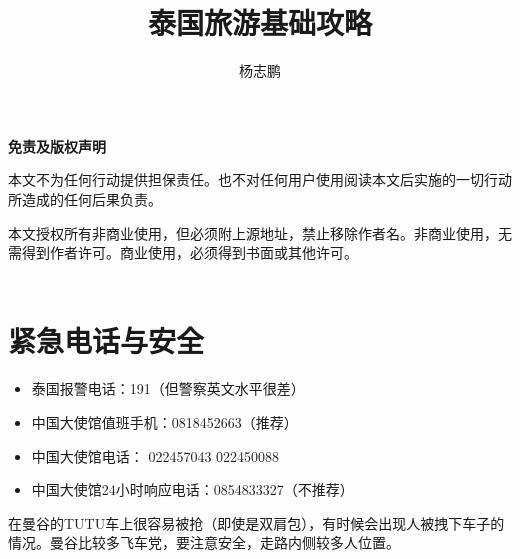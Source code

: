 \documentclass[utf-8,10pt]{ctexart}
\title{\textbf{泰国旅游基础攻略}}
\author{杨志鹏}
\begin{document}
\setcounter{page}{0}
\maketitle
\thispagestyle{empty}
\newpage
\pagestyle{fancy}
\tableofcontents
\paragraph{}
\noindent{}
\paragraph{}
\textbf{免责及版权声明}

本文不为任何行动提供担保责任。也不对任何用户使用阅读本文后实施的一切行动所造成的任何后果负责。

本文授权所有非商业使用，但必须附上源地址，禁止移除作者名。非商业使用，无需得到作者许可。商业使用，必须得到书面或其他许可。\\\\
\section{紧急电话与安全}
\begin{itemize}
\item 泰国报警电话：191（但警察英文水平很差）
\item 中国大使馆值班手机：0818452663（推荐）
\item 中国大使馆电话： 022457043 022450088
\item 中国大使馆24小时响应电话：0854833327（不推荐）
\end{itemize}

在曼谷的TUTU车上很容易被抢（即使是双肩包），有时候会出现人被拽下车子的情况。曼谷比较多飞车党，要注意安全，走路内侧较多人位置。
\end{document}
